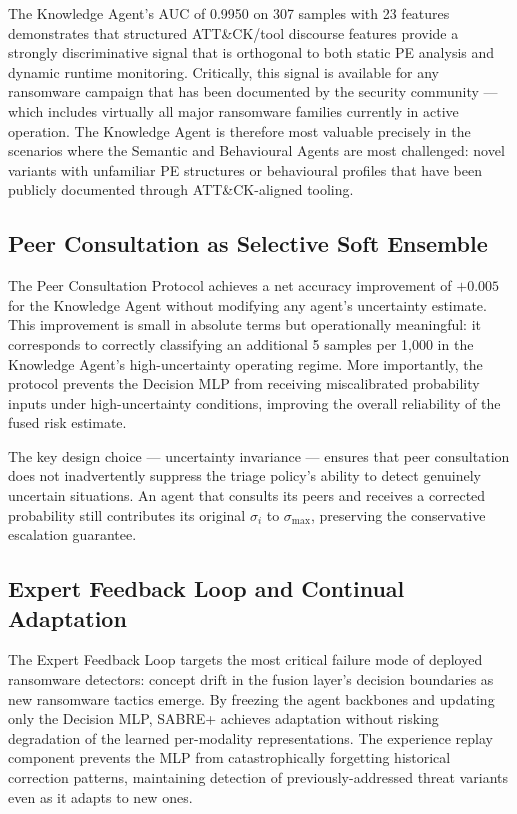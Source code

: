 The Knowledge Agent's AUC of 0.9950 on 307 samples with 23 features demonstrates that structured ATT\&CK/tool discourse features provide a strongly discriminative signal that is orthogonal to both static PE analysis and dynamic runtime monitoring. Critically, this signal is available for any ransomware campaign that has been documented by the security community — which includes virtually all major ransomware families currently in active operation. The Knowledge Agent is therefore most valuable precisely in the scenarios where the Semantic and Behavioural Agents are most challenged: novel variants with unfamiliar PE structures or behavioural profiles that have been publicly documented through ATT\&CK-aligned tooling.

\subsection{Peer Consultation as Selective Soft Ensemble}

The Peer Consultation Protocol achieves a net accuracy improvement of $+0.005$ for the Knowledge Agent without modifying any agent's uncertainty estimate. This improvement is small in absolute terms but operationally meaningful: it corresponds to correctly classifying an additional 5 samples per 1,000 in the Knowledge Agent's high-uncertainty operating regime. More importantly, the protocol prevents the Decision MLP from receiving miscalibrated probability inputs under high-uncertainty conditions, improving the overall reliability of the fused risk estimate.

The key design choice — uncertainty invariance — ensures that peer consultation does not inadvertently suppress the triage policy's ability to detect genuinely uncertain situations. An agent that consults its peers and receives a corrected probability still contributes its original $\sigma_i$ to $\sigma_\text{max}$, preserving the conservative escalation guarantee.

\subsection{Expert Feedback Loop and Continual Adaptation}

The Expert Feedback Loop targets the most critical failure mode of deployed ransomware detectors: concept drift in the fusion layer's decision boundaries as new ransomware tactics emerge. By freezing the agent backbones and updating only the Decision MLP, SABRE+ achieves adaptation without risking degradation of the learned per-modality representations. The experience replay component prevents the MLP from catastrophically forgetting historical correction patterns, maintaining detection of previously-addressed threat variants even as it adapts to new ones.

